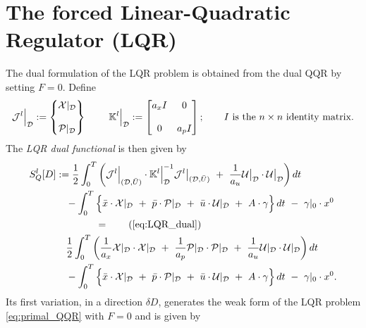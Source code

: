 \documentclass[11pt]{article}
\begin{document}
\section{The forced Linear-Quadratic Regulator (LQR)}\label{sec:LQR}
The dual formulation of the LQR problem is obtained from the dual QQR by setting $F = 0$. Define
\begin{equation*}
    \mathcal{J}^l \Big|_{\mathcal{D}} : = \begin{Bmatrix} {\cal X}|_{\mathcal{D}}  \\ \\ {\cal P}|_{\mathcal{D}}  \end{Bmatrix} \; \qquad \mathbb{K}^l \Big|_{\mathcal{D}} := \begin{bmatrix} a_x I & 0  \\
                                                                  &   \\
                                                                  0 & a_p I \end{bmatrix}; \qquad I \mbox{ is the } n \times n \mbox{ identity matrix}.\notag\\
\end{equation*}
The \emph{LQR dual functional} is then given by
\begin{subequations}
    \label{eq:LQR_dual}
    \begin{align}
        S_Q^l[D] & := \half \int_0^T \bigg( \mathcal{J}^l \Big|_{(\dee,\bar{U})} \cdot \K^l \Big|_\dee^{-1} \mathcal{J}^l \big|_{(\dee,\bar{U})} \ + \ \frac{1}{a_u} \calU \big|_\dee \cdot \calU \big|_\dee \bigg) \, dt \notag \\
        & \quad - \int_0^T \Big\{ \bar{x} \cdot \calX |_\dee  \ + \ \bar{p} \cdot \calP |_\dee  \ + \ \bar{u} \cdot \calU |_\dee \ + \ A \cdot \gamma \Big\} \, dt \ - \  \gamma|_0 \cdot x^0 \notag \\
        & \qquad \qquad = \tag{\ref{eq:LQR_dual}}\\
        & \quad \half \int_0^T \bigg( \frac{1}{a_x} \calX |_\dee \cdot \calX |_\dee \ + \ \frac{1}{a_p} \calP |_\dee \cdot \calP |_\dee \ + \  \frac{1}{a_u} \calU |_\dee \cdot \calU |_\dee \bigg) \, dt  \notag\\
        & \quad - \int_0^T \Big\{ \bar{x} \cdot \calX |_\dee  \ + \ \bar{p} \cdot \calP |_\dee  \ + \ \bar{u} \cdot \calU |_\dee \ + \ A \cdot \gamma \Big\} \, dt \ - \  \gamma|_0 \cdot x^0. \notag
    \end{align}
\end{subequations}
Its first variation, in a direction $\delta D$,  generates the weak form of the LQR problem \eqref{eq:primal_QQR} with $F = 0$ and is given by
\end{document}

